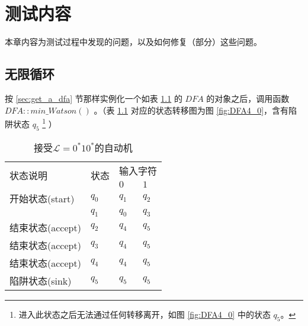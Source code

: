 \chapter{测试内容}

本章内容为测试过程中发现的问题，以及如何修复（部分）这些问题。




\section{无限循环}

按 \ref{sec:get_a_dfa} 节那样实例化一个如表 \ref{tab:DFA4} 的 $DFA$ 的对象之后，调用函数 $DFA::min\_Watson()$ 。（表 \ref{tab:DFA4} 对应的状态转移图为图 \ref{fig:DFA4_0}，含有陷阱状态 $q_5$ \footnote{进入此状态之后无法通过任何转移离开，如图 \ref{fig:DFA4_0} 中的状态 {$q_5$}。} ）

\begin{table}[!htbp]
    \caption{接受{$\mathcal{L}=0^*10^*$}的自动机{\cite{book1}}}
    \label{tab:DFA4}
    \centering
    \small%
    \setlength{\tabcolsep}{4pt}%
    \renewcommand{\arraystretch}{1.2}%
        \begin{tabular}{l p{3em}<{\centering} p{3em}<{\centering} p{3em}<{\centering}}
        \toprule %
        \multirow{2}{*}{状态说明} & \multirow{2}{*}{状态} & \multicolumn{2}{c}{输入字符} \\
		\cline{3-4}      &    &$0$ & $1$  \\
        \midrule%
        开始状态(start)  & $q_0$ & $q_1$   & $q_2$   \\
                        & $q_1$ & $q_0$   & $q_3$   \\
        结束状态(accept) & $q_2$ & $q_4$   & $q_5$   \\
        结束状态(accept) & $q_3$ & $q_4$   & $q_5$   \\
        结束状态(accept) & $q_4$ & $q_4$   & $q_5$   \\
        陷阱状态(sink) & $q_5$ & $q_5$   & $q_5$   \\
        \bottomrule%
    \end{tabular}
\end{table}

